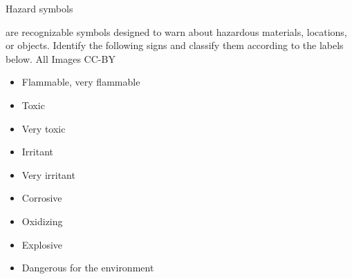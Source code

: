 \documentclass[cover.tex]{subfiles}
\begin{document}
 \begin{refsection}


\begin{bf}Hazard symbols\end{bf} are recognizable symbols designed to warn about hazardous materials, locations, or objects. Identify the following signs and classify them according to the labels below. \small{All Images CC-BY}
 \\
\begin{minipage}{.9\textwidth}
 \begin{multicols*}{3}
\begin{itemize}
\item Flammable, very flammable
\item	Toxic
\item Very toxic
\item	Irritant
\item Very irritant
\item	Corrosive
\item	Oxidizing
\item Explosive 
\item	Dangerous for the environment
\end{itemize}
\end{multicols*}

\end{minipage}


\begin{table}[h!]
  \centering
  \begin{tabular}{ cm{5cm}m{5cm}}
    

\end{tabular}
\end{table}
\end{refsection}
\end{document}
